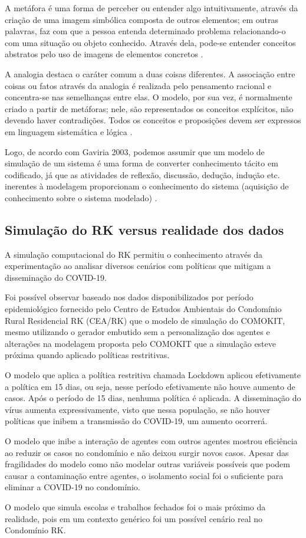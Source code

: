 A metáfora é uma forma de perceber ou entender algo intuitivamente, através da criação de uma imagem simbólica composta de outros elementos; em outras palavras, faz com que a pessoa entenda determinado problema relacionando-o com uma situação ou objeto conhecido. Através dela, pode-se entender conceitos abstratos pelo uso de imagens de elementos concretos \cite{gavira2003simulaccao}.

A analogia destaca o caráter comum a duas coisas diferentes. A associação entre coisas ou fatos através da analogia é realizada pelo pensamento racional e concentra-se nas semelhanças entre elas. O modelo, por sua vez, é normalmente criado a partir de metáforas; nele, são representados os conceitos explícitos, não devendo haver contradições. Todos os conceitos e proposições devem ser expressos em linguagem sistemática e lógica \cite{gavira2003simulaccao}.

Logo, de acordo com Gaviria 2003, podemos assumir que um modelo de simulação de um sistema é uma forma de converter conhecimento tácito em codificado, já que as atividades de reflexão, discussão, dedução, indução etc. inerentes à modelagem proporcionam o conhecimento do sistema (aquisição de conhecimento sobre o sistema modelado) \cite{gavira2003simulaccao}.


\subsection{Simulação do RK versus realidade dos dados}

A simulação computacional do RK permitiu o conhecimento através da experimentação ao analisar diversos cenários com políticas que mitigam a disseminação do COVID-19.

Foi possível observar baseado nos dados disponibilizados por período epidemiológico fornecido pelo Centro de Estudos Ambientais do Condomínio Rural Residencial RK (CEA/RK) que o modelo de simulação do COMOKIT, mesmo utilizando o gerador embutido sem a personalização dos agentes e alterações na modelagem proposta pelo COMOKIT que a simulação esteve próxima quando aplicado políticas restritivas.

O modelo que aplica a política restritiva chamada Lockdown aplicou efetivamente a política em 15 dias, ou seja, nesse período efetivamente não houve aumento de casos. Após o período de 15 dias, nenhuma política é aplicada. A disseminação do vírus aumenta expressivamente, visto que nessa população, se não houver políticas que inibem a transmissão do COVID-19, um aumento ocorrerá.

O modelo que inibe a interação de agentes com outros agentes mostrou eficiência ao reduzir os casos no condomínio e não deixou surgir novos casos. Apesar das fragilidades do modelo como não modelar outras variáveis possíveis que podem causar a contaminação entre agentes, o isolamento social foi o suficiente para eliminar a COVID-19 no condomínio.

O modelo que simula escolas e trabalhos fechados foi o mais próximo da realidade, pois em um contexto genérico foi um possível cenário real no Condomínio RK. 


